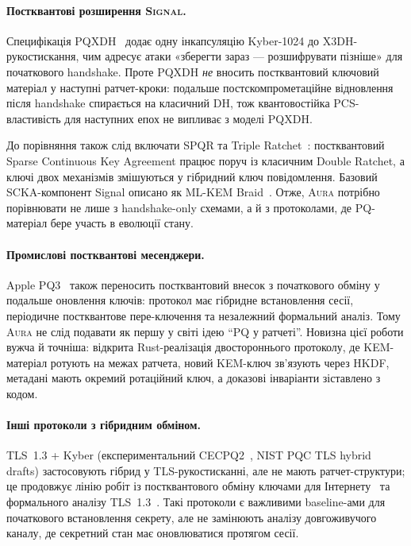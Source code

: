 \documentclass[11pt,a4paper]{article}
\theoremstyle{definition}
\newcommand{\Aura}{\mbox{\normalfont\scshape Aura}}
\newcommand{\Signal}{\mbox{\normalfont\scshape Signal}}
\newcommand{\SPQR}{\textsf{SPQR}}
\newcommand{\PQThree}{\textsf{PQ3}}
\begin{document}
\paragraph{Постквантові розширення \Signal{}.}
Специфікація PQXDH~\cite{signal-pqxdh} додає одну інкапсуляцію Kyber-1024
до X3DH-рукостискання, чим адресує атаки «зберегти зараз --- розшифрувати
пізніше» для початкового handshake. Проте PQXDH \emph{не} вносить
постквантовий ключовий матеріал у наступні ратчет-кроки: подальше
постскомпрометаційне відновлення після handshake спирається на класичний
DH, тож квантовостійка PCS-властивість для наступних епох не випливає з
моделі PQXDH.

До порівняння також слід включати \SPQR{} та Triple
Ratchet~\cite{signal-spqr,signal-double-ratchet}: постквантовий
Sparse Continuous Key Agreement працює поруч із класичним Double
Ratchet, а ключі двох механізмів змішуються у гібридний ключ
повідомлення. Базовий SCKA-компонент Signal описано як ML-KEM
Braid~\cite{mlkem-braid}. Отже, \Aura{} потрібно порівнювати не лише
з handshake-only схемами, а й з протоколами, де PQ-матеріал бере участь
в еволюції стану.

\paragraph{Промислові постквантові месенджери.}
Apple \PQThree{}~\cite{apple-pq3,stebila-pq3,linker-pq3} також
переносить постквантовий внесок з початкового обміну у подальше
оновлення ключів: протокол має гібридне встановлення сесії, періодичне
постквантове пере-ключення та незалежний формальний аналіз. Тому
\Aura{} не слід подавати як першу у світі ідею ``PQ у ратчеті''.
Новизна цієї роботи вужча й точніша: відкрита Rust-реалізація
двостороннього протоколу, де KEM-матеріал ротують на межах ратчета,
новий KEM-ключ зв'язують через HKDF, метадані мають окремий ротаційний
ключ, а доказові інваріанти зіставлено з кодом.

\paragraph{Інші протоколи з гібридним обміном.}
TLS~1.3 + Kyber (експериментальний CECPQ2~\cite{cecpq2}, NIST PQC TLS
hybrid drafts) застосовують гібрид у TLS-рукостисканні, але не мають
ратчет-структури; це продовжує лінію робіт із постквантового
обміну ключами для Інтернету~\cite{stebila2020} та формального
аналізу TLS~1.3~\cite{dowling2020}. Такі протоколи є важливими
baseline-ами для початкового встановлення секрету, але не замінюють
аналізу довгоживучого каналу, де секретний стан має оновлюватися
протягом сесії.
\end{document}

